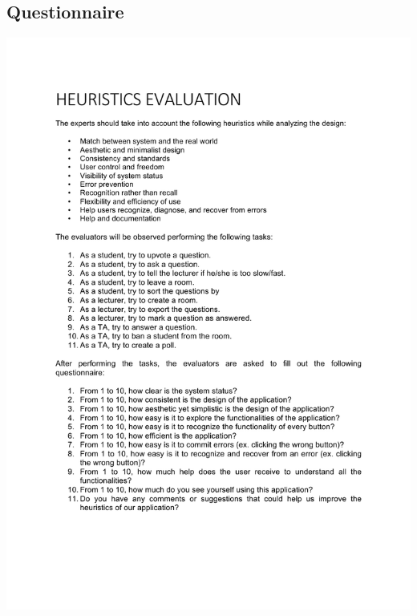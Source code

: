 \documentclass{article}
\begin{document}
\begin{appendices}
        \section{Questionnaire}
        \label{appendix:Questionnaire}
        \includegraphics[scale=0.8]{Heuristics_Evaluation_-_eu.pdf}\\



    \end{appendices}
\end{document}
